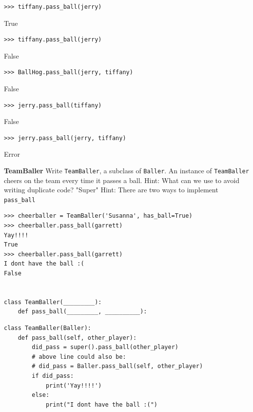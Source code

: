 \documentclass{exam}
\begin{document}
\begin{questions}
\begin{blocksection}
\begin{lstlisting}
>>> tiffany.pass_ball(jerry)
\end{lstlisting}
\begin{solution}[.2in]
True
\end{solution}

\begin{lstlisting}
>>> tiffany.pass_ball(jerry)
\end{lstlisting}
\begin{solution}[.2in]
False
\end{solution}

\begin{lstlisting}
>>> BallHog.pass_ball(jerry, tiffany)
\end{lstlisting}
\begin{solution}[.2in]
False
\end{solution}

\begin{lstlisting}
>>> jerry.pass_ball(tiffany)
\end{lstlisting}
\begin{solution}[.2in]
False
\end{solution}

\begin{lstlisting}
>>> jerry.pass_ball(jerry, tiffany)
\end{lstlisting}
\begin{solution}[.2in]
Error
\end{solution}
\end{blocksection}

\begin{blocksection}
\question \textbf{TeamBaller} \newline
Write \texttt{TeamBaller}, a subclass of \texttt{Baller}. An instance of \texttt{TeamBaller} cheers on the team every time it passes a ball.  \newline
Hint: What can we use to avoid writing duplicate code? \newline
"Super" Hint: There are two ways to implement \texttt{pass\_ball} \newline

\begin{lstlisting}
>>> cheerballer = TeamBaller('Susanna', has_ball=True)
>>> cheerballer.pass_ball(garrett)
Yay!!!!
True
>>> cheerballer.pass_ball(garrett)
I dont have the ball :(
False


class TeamBaller(_________):
    def pass_ball(_________, __________):
\end{lstlisting}
\begin{solution}[1in]
\begin{lstlisting}
class TeamBaller(Baller):
    def pass_ball(self, other_player):
        did_pass = super().pass_ball(other_player) 
        # above line could also be:
        # did_pass = Baller.pass_ball(self, other_player)
        if did_pass:
            print('Yay!!!!')
        else:
            print("I dont have the ball :(")
\end{lstlisting}
\end{solution}
\end{blocksection}


\end{questions}
\end{document}
